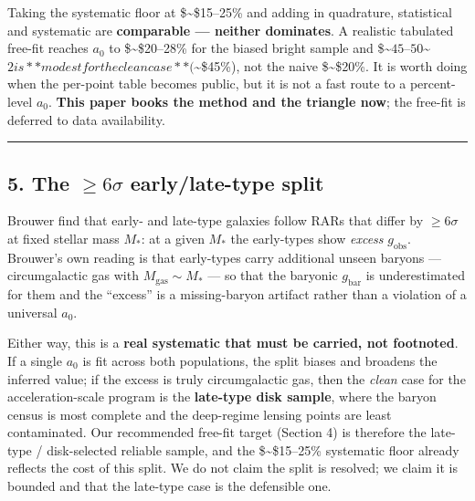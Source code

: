 \documentclass[
]{article}
\begin{document}
Taking the systematic floor at \$\sim\$15--25\% and adding in
quadrature, statistical and systematic are \textbf{comparable ---
neither dominates}. A realistic tabulated free-fit reaches \(a_0\) to
\$\sim\$20--28\% for the biased bright sample and
\$\sim\(45–50%
\)\sim\(2 is **modest for the clean case** (\)\sim\$45\%), not the naive
\$\sim\$20\%. It is worth doing when the per-point table becomes public,
but it is not a fast route to a percent-level \(a_0\). \textbf{This
paper books the method and the triangle now}; the free-fit is deferred
to data availability.

\begin{center}\rule{0.5\linewidth}{0.5pt}\end{center}

\subsection{\texorpdfstring{5. The \(\ge6\sigma\) early/late-type
split}{5. The \textbackslash ge6\textbackslash sigma early/late-type split}}\label{the-ge6sigma-earlylate-type-split}

Brouwer find that early- and late-type galaxies follow RARs that differ
by \(\ge6\sigma\) at fixed stellar mass \(M_*\): at a given \(M_*\) the
early-types show \emph{excess} \(g_\mathrm{obs}\). Brouwer's own reading is
that early-types carry additional unseen baryons --- circumgalactic gas
with \(M_\mathrm{gas}\sim M_*\) --- so that the baryonic \(g_\mathrm{bar}\) is
underestimated for them and the ``excess'' is a missing-baryon artifact
rather than a violation of a universal \(a_0\).

Either way, this is a \textbf{real systematic that must be carried, not
footnoted}. If a single \(a_0\) is fit across both populations, the
split biases and broadens the inferred value; if the excess is truly
circumgalactic gas, then the \emph{clean} case for the
acceleration-scale program is the \textbf{late-type disk sample}, where
the baryon census is most complete and the deep-regime lensing points
are least contaminated. Our recommended free-fit target (Section 4) is
therefore the late-type / disk-selected reliable sample, and the
\$\sim\$15--25\% systematic floor already reflects the cost of this
split. We do not claim the split is resolved; we claim it is bounded and
that the late-type case is the defensible one.
\end{document}

